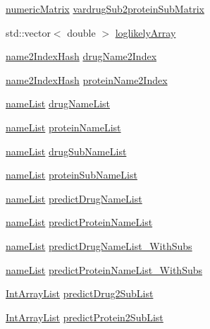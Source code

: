 \begin{DoxyCompactItemize}
\item 
\hyperlink{namespacegift_a4e11987023733fe14bdabd0b52e78583}{numeric\+Matrix} \hyperlink{namespacegift_a7191203810c7c52faceb69ac903e7899}{vardrug\+Sub2protein\+Sub\+Matrix}
\item 
std\+::vector$<$ double $>$ \hyperlink{namespacegift_ac31667d9b67b35a70ac9d46dfe6a7967}{loglikely\+Array}
\item 
\hyperlink{namespacegift_a88a96011620ed18b8321bc36a816773c}{name2\+Index\+Hash} \hyperlink{namespacegift_a3385bc2f0aa26289e7f7d69635207e5d}{drug\+Name2\+Index}
\item 
\hyperlink{namespacegift_a88a96011620ed18b8321bc36a816773c}{name2\+Index\+Hash} \hyperlink{namespacegift_ad49c613c81da3c4189ea4f16915c60c5}{protein\+Name2\+Index}
\item 
\hyperlink{namespacegift_a62f85efaab3bff48335863ae0670c7a7}{name\+List} \hyperlink{namespacegift_a8ace6c6707676ba4866203d5ddc0a02e}{drug\+Name\+List}
\item 
\hyperlink{namespacegift_a62f85efaab3bff48335863ae0670c7a7}{name\+List} \hyperlink{namespacegift_ac03221463832a0531081c053ed10bafd}{protein\+Name\+List}
\item 
\hyperlink{namespacegift_a62f85efaab3bff48335863ae0670c7a7}{name\+List} \hyperlink{namespacegift_afacd45b62c4abab4c029c7b0e82a149c}{drug\+Sub\+Name\+List}
\item 
\hyperlink{namespacegift_a62f85efaab3bff48335863ae0670c7a7}{name\+List} \hyperlink{namespacegift_a55fa4ad0822bcbe5ca42f2962e111ef1}{protein\+Sub\+Name\+List}
\item 
\hyperlink{namespacegift_a62f85efaab3bff48335863ae0670c7a7}{name\+List} \hyperlink{namespacegift_a9cc6da68eeea28ac6c6a65cd9f248e5b}{predict\+Drug\+Name\+List}
\item 
\hyperlink{namespacegift_a62f85efaab3bff48335863ae0670c7a7}{name\+List} \hyperlink{namespacegift_a03bb78fc438e2b1af29ff3b46b70a085}{predict\+Protein\+Name\+List}
\item 
\hyperlink{namespacegift_a62f85efaab3bff48335863ae0670c7a7}{name\+List} \hyperlink{namespacegift_a85bd1982c5b60a7cf09a0f80398bb051}{predict\+Drug\+Name\+List\+\_\+\+With\+Subs}
\item 
\hyperlink{namespacegift_a62f85efaab3bff48335863ae0670c7a7}{name\+List} \hyperlink{namespacegift_a03aaa96d826b6a887accc3951939ccde}{predict\+Protein\+Name\+List\+\_\+\+With\+Subs}
\item 
\hyperlink{namespacegift_a98b589c33d80e413fceaf8afd8e25815}{Int\+Array\+List} \hyperlink{namespacegift_a00bda5cc17262f36063eed0fbf03459c}{predict\+Drug2\+Sub\+List}
\item 
\hyperlink{namespacegift_a98b589c33d80e413fceaf8afd8e25815}{Int\+Array\+List} \hyperlink{namespacegift_a4899f631bc8342759f4096e7b653eed8}{predict\+Protein2\+Sub\+List}
\end{DoxyCompactItemize}


